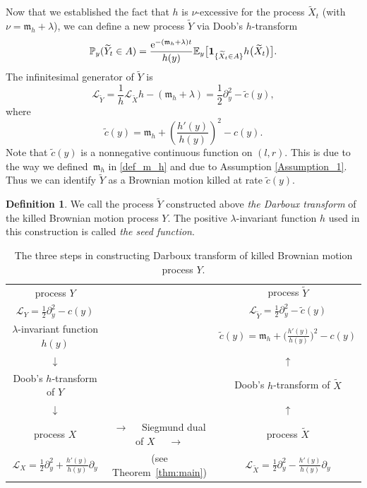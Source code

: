 \documentclass[pdftex]{sigma}
\numberwithin{equation}{section}
\theoremstyle{definition}
\newtheorem{Definition}[Theorem]{Definition}
\def\L{{\mathcal L}}
\def\p{{\mathbb P}}
\def\e{{\mathbb E}}
\begin{document}
Now that we established the fact that $h$ is $\nu$-excessive for the process $\widetilde X_t$ (with $\nu={\mathfrak m}_h + \lambda$), we can define a new process $\widetilde Y$ via Doob's $h$-transform
\[
\p_y (\widetilde Y_t \in A)=\frac{{\rm e}^{-({\mathfrak m}_h+\lambda) t}}{h(y)}
\e_y\big[ {\mathbf 1}_{\{\widetilde X_t \in A\}} h\bigl(\widetilde X_t\bigr)\big].
\]
The infinitesimal generator of $\widetilde Y$ is
\[
\L_{\widetilde Y}=\frac{1}{h} \L_{\widetilde X} h - ({\mathfrak m}_h+\lambda)
=\frac{1}{2} \partial_y^2 - \tilde c(y),
\]
where
\begin{equation}\label{new_tilde_c}
\tilde c(y)={\mathfrak m}_h+\left(\frac{h'(y)}{h(y)}\right)^2 - c(y).
\end{equation}
Note that $\tilde c(y)$ is a nonnegative continuous function on $(l,r)$. This is due to the way we defined~${\mathfrak m}_h$ in \eqref{def_m_h} and due to Assumption \ref{Assumption_1}. Thus we can identify $\widetilde Y$ as a Brownian motion killed at rate $\tilde c(y)$.


\begin{Definition}\label{def_Darboux_transform}
{\textnormal{
We call the process $\widetilde Y$ constructed above {\it the Darboux transform} of the killed Brownian motion process $Y$. The positive $\lambda$-invariant function $h$ used in this construction is called {\it the seed function}. }}
\end{Definition}

\begin{table}[t!]\centering
\begin{tabular}{ c c c }
 process $Y$ & $\qquad \qquad \qquad \qquad $ & process $\widetilde Y$ \\
 $\L_Y=\frac{1}{2} \partial_y^2 - c(y)$ & & $\L_{\widetilde Y}=\frac{1}{2} \partial_y^2 - \tilde c(y)$ \\
 $\lambda$-invariant function $h(y)$ & & $\tilde c(y)={\mathfrak m}_h+\bigl(\frac{h'(y)}{h(y)} \bigr)^2 - c(y)$\\
 \rule{0pt}{15pt}
 $\downarrow$ & & $\uparrow$ \\
 \rule{0pt}{20pt}
 Doob's $h$-transform of $Y$ & & Doob's $h$-transform of $\widetilde X$ \\
 \rule{0pt}{15pt}
 $\downarrow$ & & $\uparrow$ \\
 \rule{0pt}{20pt}
 process $X$ & $\rightarrow \quad $ Siegmund dual of $X$
 $\quad \rightarrow $ & process $\widetilde X$ \\
 $\L_X=\frac{1}{2} \partial_y^2 + \frac{h'(y)}{h(y)} \partial_y$ & (see Theorem~\ref{thm:main}) & $\L_{\widetilde X}=\frac{1}{2} \partial_y^2 - \frac{h'(y)}{h(y)} \partial_y$ \\
\end{tabular}

\caption{The three steps in constructing Darboux transform of killed Brownian motion process $Y$.}\label{table:1}
\end{table}
\end{document}
